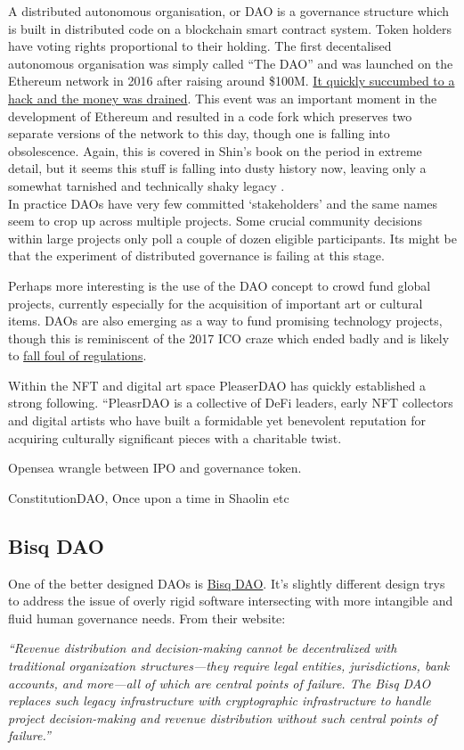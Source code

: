 A distributed autonomous organisation, or DAO is a governance structure which is built in distributed code on a blockchain smart contract system. Token holders have voting rights proportional to their holding. The first decentalised autonomous organisation was simply called ``The DAO'' and was launched on the Ethereum network in 2016 after raising around \$100M. \href{https://www.gemini.com/cryptopedia/the-dao-hack-makerdao#section-what-is-a-dao}{It quickly succumbed to a hack and the money was drained}. This event was an important moment in the development of Ethereum and resulted in a code fork which preserves two separate versions of the network to this day, though one is falling into obsolescence. Again, this is covered in Shin's book on the period in extreme detail, but it seems this stuff is falling into dusty history now, leaving only a somewhat tarnished and technically shaky legacy \cite{cryptopians}. \\
In practice DAOs have very few committed `stakeholders' and the same names seem to crop up across multiple projects. Some crucial community decisions within large projects only poll a couple of dozen eligible participants. Its might be that the experiment of distributed governance is failing at this stage. \par
Perhaps more interesting is the use of the DAO concept to crowd fund global projects, currently especially for the acquisition of important art or cultural items. DAOs are also emerging as a way to fund promising technology projects, though this is reminiscent of the 2017 ICO craze which ended badly and is likely to \href{https://www.cftc.gov/PressRoom/PressReleases/8590-22}{fall foul of regulations}.\par
Within the NFT and digital art space  PleaserDAO has quickly established a strong following.
``PleasrDAO is a collective of DeFi leaders, early NFT collectors and digital artists who have built a formidable yet benevolent reputation for acquiring culturally significant pieces with a charitable twist.\par
Opensea wrangle between IPO and governance token.\par
ConstitutionDAO, Once upon a time in Shaolin etc 

\subsection{Bisq DAO}
One of the better designed DAOs is \href{https://bisq.network/dao/}{Bisq DAO}. It's slightly different design trys to address the issue of overly rigid software intersecting with more intangible and fluid human governance needs. From their website:\par
\textit{``Revenue distribution and decision-making cannot be decentralized with traditional organization structures—they require legal entities, jurisdictions, bank accounts, and more—all of which are central points of failure.
The Bisq DAO replaces such legacy infrastructure with cryptographic infrastructure to handle project decision-making and revenue distribution without such central points of failure.''}

